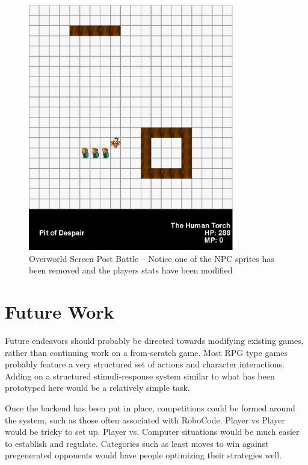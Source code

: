 \documentclass[11pt]{article}
\begin{document}
\begin{figure}[h!]
\begin{center}
\leavevmode
\includegraphics[width=0.8\textwidth]{images/overworld_postbattle}
\end{center}
\caption{Overworld Screen Post Battle -- Notice one of the NPC sprites has been removed and the players stats have been modified}
\end{figure}
\newpage


\section{Future Work}

Future endeavors should probably be directed towards modifying existing games, rather than continuing work on a from-scratch game.  Most RPG type games probably feature a very structured set of actions and character interactions.  Adding on a structured stimuli-response system similar to what has been prototyped here would be a relatively simple task.

Once the backend has been put in place, competitions could be formed around the system, such as those often associated with RoboCode.  Player vs Player would be tricky to set up.  Player vs. Computer situations would be much easier to establish and regulate.  Categories such as least moves to win against pregenerated opponents would have people optimizing their strategies well. 
\end{document}
